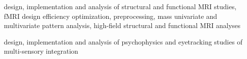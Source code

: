  design, implementation and analysis of structural and functional MRI studies, fMRI design efficiency optimization, preprocessing, mass univariate and multivariate pattern analysis, high-field structural and functional MRI analyses

 design, implementation and analysis of psychophysics and eyetracking studies of multi-sensory integration 




 



